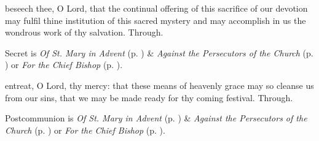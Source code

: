 \secret
{} beseech thee, O Lord, that the continual offering of this sacrifice of our devotion may fulfil thine institution of this sacred mystery and may accomplish in us the wondrous work of thy salvation. Through.
\begin{rubric}
     Secret is \emph{Of St. Mary in Advent} (p. \pageref{SPMaryInAdvent}) \&  \emph{Against the Persecutors of the Church} (p. \pageref{SPAgainst}) or \emph{For the Chief Bishop} (p. \pageref{SPChiefBishop}).
\end{rubric}

\vspace{-1ex}


\vspace{-1ex}

\postcommunion
{} entreat, O Lord, thy mercy: that these means of heavenly grace may so cleanse us from our sins, that we may be made ready for thy coming festival. Through.
\begin{rubric}
     Postcommunion is \emph{Of St. Mary in Advent} (p. \pageref{SPMaryInAdvent}) \&  \emph{Against the Persecutors of the Church} (p. \pageref{SPAgainst}) or \emph{For the Chief Bishop} (p. \pageref{SPChiefBishop}).
\end{rubric}


